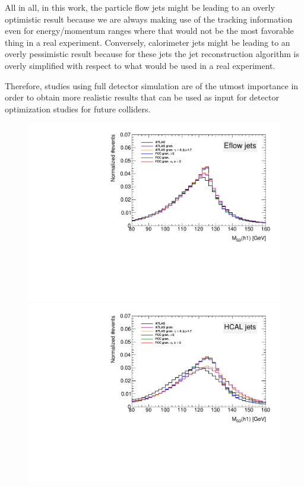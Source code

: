 All in all, in this work, the particle flow jets might be leading to an overly optimistic result because we are always making use of the tracking information even for energy/momentum ranges where that would not be the most favorable thing in a real experiment. Conversely, calorimeter jets might be leading to an overly pessimistic result because for these jets the jet reconstruction algorithm is overly simplified with respect to what would be used in a real experiment.

Therefore, studies using full detector simulation are of the utmost importance in order to obtain more realistic results that can be used as input for detector optimization studies for future colliders.

\begin{figure}
	\centering
	\begin{minipage}[t]{.5\textwidth}
		\centering
		\includegraphics[trim={.55cm 0 0 0},clip,width=\linewidth]{./Figures/M.pdf}
		
	\end{minipage}%
	\begin{minipage}[t]{.5\textwidth}
		\centering
		\includegraphics[trim={0 0 .55cm 0},clip,width=\linewidth]{./Figures/MCALO.pdf}
	\end{minipage}
	

\end{figure}
